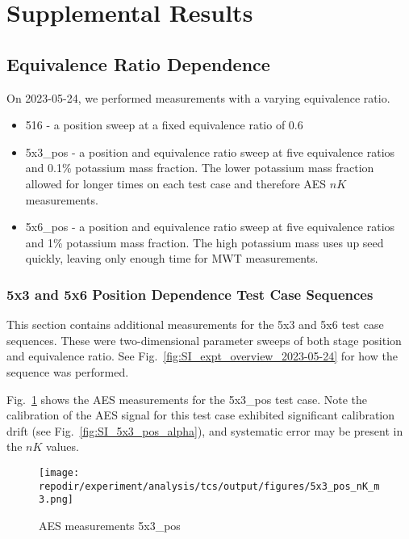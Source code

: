 \section{Supplemental Results}

\subsection{Equivalence Ratio Dependence}

On 2023-05-24, we performed measurements with a varying equivalence ratio. 

\begin{itemize}
    \item 516 - a position sweep at a fixed equivalence ratio of 0.6
    \item 5x3\_pos - a position and equivalence ratio sweep at five equivalence ratios and 0.1\% potassium mass fraction. The lower potassium mass fraction allowed for longer times on each test case and therefore AES $nK$ measurements. 
    \item 5x6\_pos - a position and equivalence ratio sweep at five equivalence ratios and 1\% potassium mass fraction. The high potassium mass uses up seed quickly, leaving only enough time for MWT measurements. 
\end{itemize}
 
\subsubsection{5x3 and 5x6 Position Dependence Test Case Sequences}

This section contains additional measurements for the 5x3 and 5x6 test case sequences. These were two-dimensional parameter sweeps of both stage position and equivalence ratio. See Fig.\ \ref{fig:SI_expt_overview_2023-05-24} for how the sequence was performed. 

Fig.\ \ref{fig:SI_5x3_pos_nK_m3} shows the AES measurements for the 5x3\_pos test case. Note the calibration of the AES signal for this test case exhibited significant calibration drift (see Fig.\ \ref{fig:SI_5x3_pos_alpha}), and systematic error may be present in the $nK$ values. 


\begin{figure}[]
\centering
\texttt{[image: \\repodir/experiment/analysis/tcs/output/figures/5x3\_pos\_nK\_m3.png]}
\caption{AES measurements 5x3\_pos}
\label{fig:SI_5x3_pos_nK_m3}
\end{figure}

